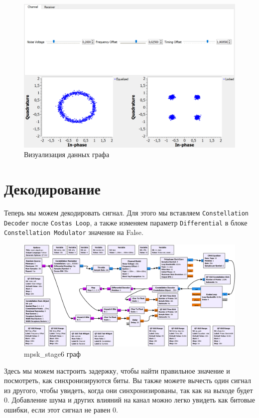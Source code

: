 \documentclass[a4paper,12pt]{report}
\begin{document}
\begin{figure}[H]
        \centering
        \includegraphics[width=1.0\textwidth]{26.png}
        \caption{Визуализация данных графа}
        \label{fig:lab12_fig6_2}
\end{figure}

\chapter{Декодирование}

Теперь мы можем декодировать сигнал. Для этого мы вставляем \texttt{Constellation Decoder} после \texttt{Costas Loop}, а также изменяем параметр \texttt{Differential} в блоке \texttt{Constellation Modulator} значение на False.

\begin{figure}[H]
        \centering
        \includegraphics[width=1.0\textwidth]{27.png}
        \caption{mpsk\_stage6 граф}
        \label{fig:lab12_fig7_1}
\end{figure}

 Здесь мы можем настроить задержку, чтобы найти правильное значение и посмотреть, как синхронизируются биты. Вы также можете вычесть один сигнал из другого, чтобы увидеть, когда они синхронизированы, так как на выходе будет 0. Добавление шума и других влияний на канал можно легко увидеть как битовые ошибки, если этот сигнал не равен 0.
 
\end{document}
